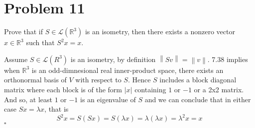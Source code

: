 \documentclass[12pt]{article}
\newcommand{\R}{\mathbb{R}}
\newenvironment{proof}{\noindent{\bf Proof.}}{\hfill $\square$\medskip}
\begin{document}
\newpage
\section{Problem 11}
Prove that if $S\in\mathcal{L}(\R^{3})$ is an isometry, then there exists a nonzero vector $x\in\R^{3}$ such that $S^{2}x=x$.

\begin{proof}
Assume $S\in\mathcal{L}(R^{3})$ is an isometry, by definition $\left\|{Sv}\right\|=\left\|v\right\|$. 7.38 implies when $\R^{3}$ is an odd-dimnesional real inner-product space, there exists an orthonormal basis of $V$ with respect to $S$. Hence $S$ includes a block diagonal matrix where each block is of the form $\left |x\right |$ containing $1$ or $-1$ or a 2x2 matrix. And so, at least $1$ or $-1$ is an eigenvalue of $S$ and we can conclude that in either case $Sx=\lambda x$, that is
$$S^{2}x=S(Sx)=S(\lambda x)=\lambda(\lambda x)=\lambda^{2}x=x$$
\end{proof}
\end{document}
